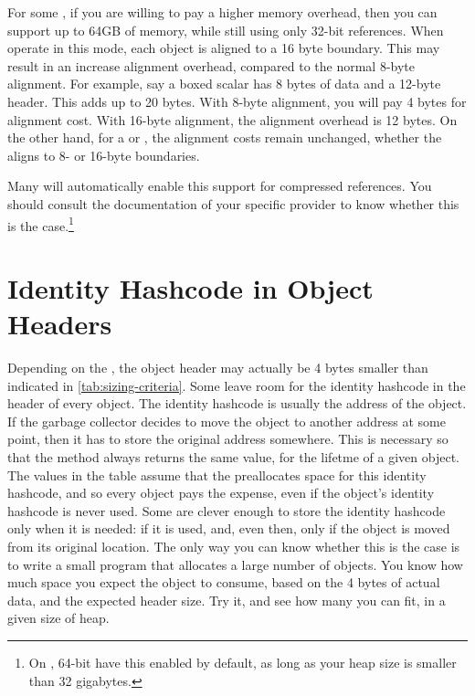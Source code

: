 For some \jres, if you are willing to pay a higher memory overhead, then you can
support up to 64GB of memory, while still using only 32-bit references. When
\jres operate in this mode, each object is aligned to a 16 byte boundary. This
may result in an increase alignment overhead, compared to the normal 8-byte
alignment. For example, say a  boxed scalar has 8 bytes of data
and a 12-byte header. This adds up to 20 bytes. With 8-byte alignment, you will
pay 4 bytes for alignment cost. With 16-byte alignment, the alignment overhead
is 12 bytes. On the other hand, for a  or , the
alignment costs remain unchanged, whether the \jre aligns to 8- or 16-byte
boundaries.

Many \jres will automatically enable this support for compressed references. You
should consult the documentation of your specific \jre provider to know whether
this is the case.\footnote{On \javaseven, 64-bit
\oracle \jres have this enabled by default, as long as your heap size is smaller
than 32 gigabytes.}



\section{Identity Hashcode in Object Headers}

Depending on the \jre, the object header may actually be 4 bytes smaller than
indicated in \autoref{tab:sizing-criteria}. Some \jres leave room for the
identity hashcode in the header of every object. The identity hashcode is
usually the address of the object. If the garbage collector decides to move the
object to another address at some point, then it has to store the original
address somewhere. This is necessary so that the  method
always returns the same value, for the lifetme of a given object. The values in
the table assume that the \jre preallocates space for this identity hashcode,
and so every object pays the expense, even if the object's identity hashcode is
never used. Some \jres are clever enough to store the identity hashcode only
when it is needed: if it is used, and, even then, only if the object is moved
from its original location. The only way you can know whether this is the case
is to write a small program that allocates a large number of 
objects. You know how much space you expect the object to consume, based on the
4 bytes of actual data, and the expected header size. Try it, and see how many
you can fit, in a given size of heap.

